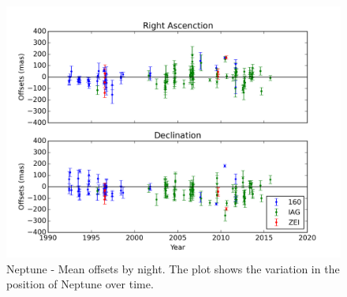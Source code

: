 \documentclass[12pt,a4paper]{report}
\newcommand{\PE}{Perkin-Elmer }
\newcommand{\BC}{Boller \& Chivens }
\begin{document}



\begin{figure}[H]
\includegraphics[width=16.0cm]{Neptune_offsets.png} 
\caption{Neptune - Mean offsets by night. The plot shows the variation in the position of Neptune over time. }
\label{Fig:netuno-media}
\end{figure}
\end{document}
